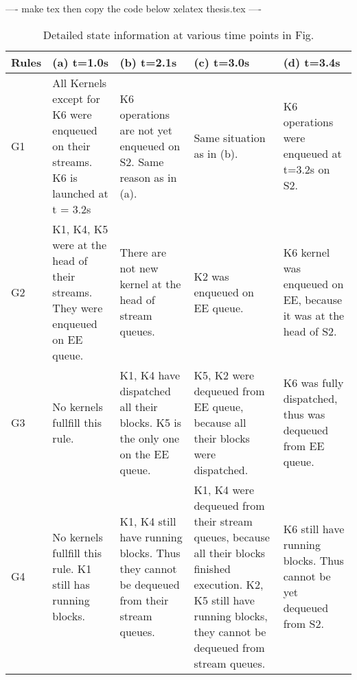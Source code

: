 
----
make tex
then copy the code below
xelatex thesis.tex
----

\begin{table}[hbtp]
\small
\begin{tabularx}{\linewidth}{|X|X|X|X|X|}
    \hline
Rules & (a) t=1.0s & (b) t=2.1s & (c) t=3.0s & (d) t=3.4s \\ \hline
G1 & All Kernels except for K6 were enqueued on their streams. K6 is launched at t = 3.2s & K6 operations are not yet enqueued on  S2. Same reason as in (a). & Same situation as in (b). & K6 operations were enqueued at t=3.2s on S2. \\ \hline
G2 & K1, K4, K5 were at the head of their streams. They were enqueued on EE queue. & There are not new kernel at the head of stream queues. & K2 was enqueued on EE queue. & K6 kernel was enqueued on EE, because it was at the head of S2. \\ \hline
G3 & No kernels fullfill this rule. & K1, K4 have dispatched all their blocks. K5 is the only one on the EE queue. & K5, K2 were dequeued from EE queue, because all their blocks were dispatched.  & K6 was fully dispatched, thus was dequeued from EE queue. \\ \hline
G4 & No kernels fullfill this rule. K1 still has running blocks. & K1, K4 still have running blocks. Thus they cannot be dequeued from their stream queues. & K1, K4 were dequeued from their stream queues, because all their blocks finished execution. K2, K5 still have running blocks, they cannot be dequeued from stream queues. & K6 still have running blocks. Thus cannot be yet dequeued from S2. \\ \hline
\end{tabularx}
\label{tab:scheduler_rules1}
\caption{Detailed state information at various time points in Fig.}
\end{table}


